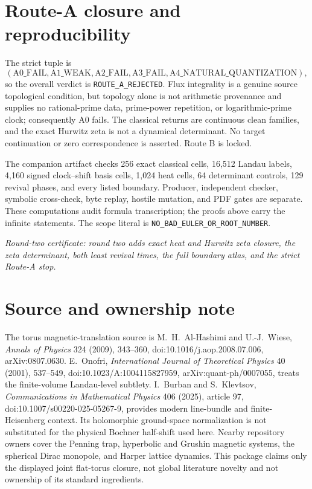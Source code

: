\documentclass[10pt]{article}
\begin{document}
\section{Route-A closure and reproducibility}

The strict tuple is
\[
 (\mathrm{A0\_FAIL},\mathrm{A1\_WEAK},
  \mathrm{A2\_FAIL},\mathrm{A3\_FAIL},
  \mathrm{A4\_NATURAL\_QUANTIZATION}),
\]
so the overall verdict is \texttt{ROUTE\_A\_REJECTED}.  Flux integrality is
a genuine source topological condition, but topology alone is not arithmetic
provenance and supplies no rational-prime data, prime-power repetition, or
logarithmic-prime clock; consequently A0 fails.
The classical returns are continuous clean families, and the exact Hurwitz
zeta is not a dynamical determinant.  No target continuation or zero
correspondence is asserted.  Route B is locked.

The companion artifact checks 256 exact classical cells, 16,512 Landau
labels, 4,160 signed clock--shift basis cells, 1,024 heat cells, 64 determinant
controls, 129 revival phases, and every listed boundary.  Producer,
independent checker, symbolic cross-check, byte replay, hostile mutation,
and PDF gates are separate.  These computations audit formula
transcription; the proofs above carry the infinite statements.  The scope
literal is \texttt{NO\_BAD\_EULER\_OR\_ROOT\_NUMBER}.

\noindent\textit{Round-two certificate: round two adds exact heat and
Hurwitz zeta closure, the zeta determinant, both least revival times, the
full boundary atlas, and the strict Route-A stop.}

\section*{Source and ownership note}
The torus magnetic-translation source is M.~H.~Al-Hashimi and
U.-J.~Wiese, \emph{Annals of Physics} 324 (2009), 343--360,
doi:10.1016/j.aop.2008.07.006, arXiv:0807.0630.  E.~Onofri,
\emph{International Journal of Theoretical Physics} 40 (2001), 537--549,
doi:10.1023/A:1004115827959, arXiv:quant-ph/0007055, treats the
finite-volume Landau-level subtlety.
I.~Burban and S.~Klevtsov, \emph{Communications in Mathematical Physics}
406 (2025), article 97, doi:10.1007/s00220-025-05267-9, provides modern
line-bundle and finite-Heisenberg context.  Its holomorphic ground-space
normalization is not substituted for the physical Bochner half-shift used
here.  Nearby repository owners cover the Penning trap, hyperbolic and
Grushin magnetic systems, the spherical Dirac monopole, and Harper lattice
dynamics.  This package claims only the displayed joint flat-torus closure,
not global literature novelty and not ownership of its standard ingredients.
\fi
\end{document}
